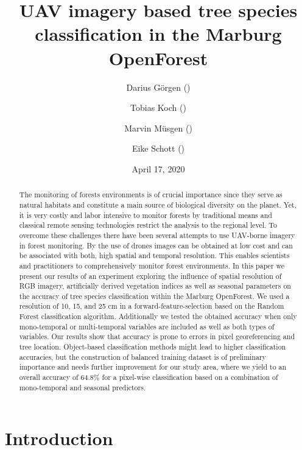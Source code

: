 \documentclass[]{article}
\title{UAV imagery based tree species classification in the Marburg OpenForest}
\author{Darius Görgen () \and Tobias Koch () \and Marvin Müsgen () \and Eike Schott ()}
\date{April 17, 2020}
\begin{document}
\maketitle
\begin{abstract}
The monitoring of forests environments is of crucial importance since
they serve as natural habitats and constitute a main source of
biological diversity on the planet. Yet, it is very costly and labor
intensive to monitor forests by traditional means and classical remote
sensing technologies restrict the analysis to the regional level. To
overcome these challenges there have been several attempts to use
UAV-borne imagery in forest monitoring. By the use of drones images can
be obtained at low cost and can be associated with both, high spatial
and temporal resolution. This enables scientists and practitioners to
comprehensively monitor forest environments. In this paper we present
our results of an experiment exploring the influence of spatial
resolution of RGB imagery, artificially derived vegetation indices as
well as seasonal parameters on the accuracy of tree species
classification within the Marburg OpenForest. We used a resolution of
10, 15, and 25 cm in a forward-feature-selection based on the Random
Forest classification algorithm. Additionally we tested the obtained
accuracy when only mono-temporal or multi-temporal variables are
included as well as both types of variables. Our results show that
accuracy is prone to errors in pixel georeferencing and tree location.
Object-based classification methods might lead to higher classification
accuracies, but the construction of balanced training dataset is of
preliminary importance and needs further improvement for our study area,
where we yield to an overall accuracy of 64.8\% for a pixel-wise
classification based on a combination of mono-temporal and seasonal
predictors.
\end{abstract}

{
\setcounter{tocdepth}{2}
\tableofcontents
}
\newpage

\hypertarget{introduction}{%
\section{Introduction}\label{introduction}}
\end{document}
